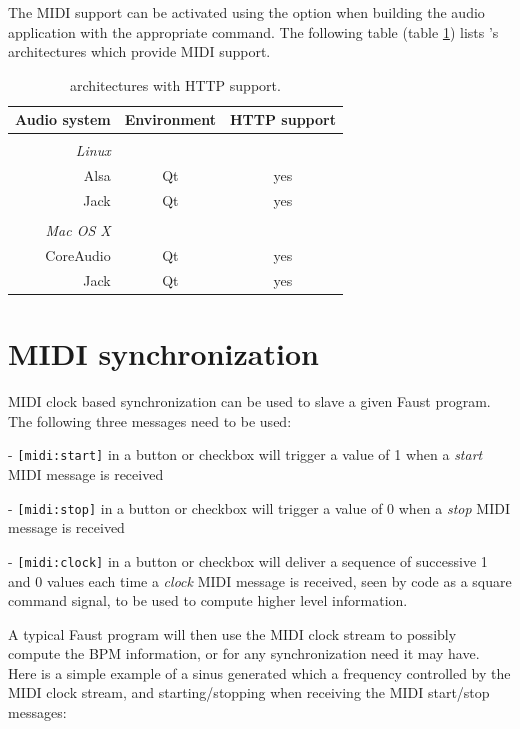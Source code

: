 The MIDI support can be activated using the  option when building the audio application with the appropriate  command. The following table (table \ref{tab:midiarch}) lists \faust's architectures which provide MIDI support. 

\begin{table}[htp]
\begin{center}
\begin{tabular}{rcc}
\hline
\bf{Audio system} 	& \bf{Environment} & \bf{HTTP support}	\\
\hline
\\
\emph{Linux}\\
Alsa  		& Qt		& yes\\
Jack 			& Qt		& yes\\
\\
\emph{Mac OS X} \\
CoreAudio 	& Qt 	 & yes\\
Jack 			& Qt  & yes\\
\hline
\end{tabular}
\end{center}
\caption{\faust architectures with HTTP support.}
\label{tab:midiarch}
\end{table}

\section{MIDI synchronization}

MIDI clock based synchronization can be used to slave a given Faust program. The following three messages need to be used:

- \lstinline'[midi:start]' in a button or checkbox will trigger a value of 1 when a \emph{start} MIDI message is received

- \lstinline'[midi:stop]' in a button or checkbox will trigger a value of 0 when a \emph{stop} MIDI message is received

- \lstinline'[midi:clock]' in a button or checkbox will deliver a sequence of successive 1 and 0 values each time a  \emph{clock} MIDI message is received, seen by \faust code as a square command signal, to be used to compute higher level information.

A typical Faust program will then use the MIDI clock stream to possibly compute the BPM information, or for any synchronization need it may have.  Here is a simple example of a sinus generated which a frequency controlled by the MIDI clock stream, and starting/stopping when receiving the MIDI start/stop messages:

